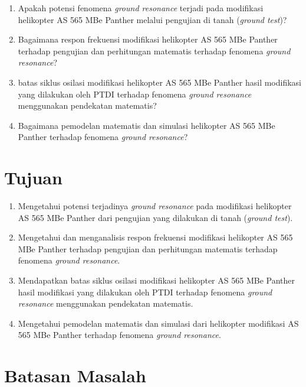 \begin{enumerate}[nolistsep]
	
	\item Apakah potensi fenomena \textit{ground resonance} terjadi pada modifikasi helikopter AS 565 MBe Panther melalui pengujian di tanah (\textit{ground test})?
	
	\item Bagaimana respon frekuensi modifikasi helikopter AS 565 MBe Panther terhadap pengujian dan perhitungan matematis terhadap fenomena \textit{ground resonance}?
	
	\item batas siklus osilasi modifikasi helikopter AS 565 MBe Panther hasil modifikasi yang dilakukan oleh PTDI terhadap fenomena \textit{ground resonance} menggunakan pendekatan matematis?
	
	\item Bagaimana pemodelan matematis dan simulasi helikopter AS 565 MBe Panther terhadap fenomena \textit{ground resonance}? 
\end{enumerate}

\section{Tujuan}
\label{sec:Tujuan}

\begin{enumerate}[nolistsep]

	\item Mengetahui potensi terjadinya \textit{ground resonance} pada modifikasi helikopter AS 565 MBe Panther dari pengujian yang dilakukan di tanah (\textit{ground test}).
	
	\item Mengetahui dan menganalisis respon frekuensi modifikasi helikopter AS 565 MBe Panther terhadap pengujian dan perhitungan matematis terhadap fenomena \textit{ground resonance}.
	
	\item Mendapatkan batas siklus osilasi modifikasi helikopter AS 565 MBe Panther hasil modifikasi yang dilakukan oleh PTDI terhadap fenomena \textit{ground resonance} menggunakan pendekatan matematis.
	
	\item Mengetahui pemodelan matematis dan simulasi dari helikopter modifikasi AS 565 MBe Panther terhadap fenomena \textit{ground resonance}.
\end{enumerate}

\section{Batasan Masalah}
\label{sec:batasanmasalah}

